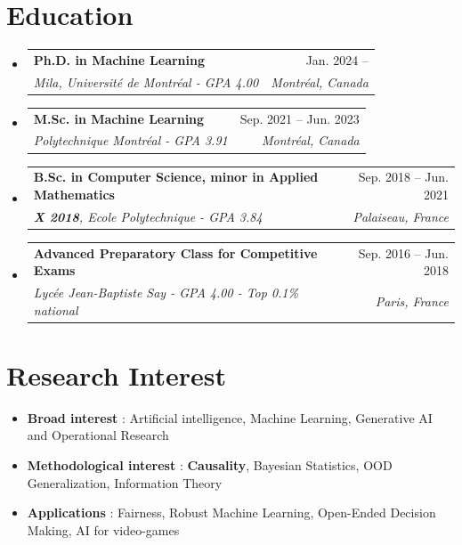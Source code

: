 \documentclass[letterpaper,11pt]{article}
\makeatletter
\newcommand{\resumeSubheading}[4]{
  \vspace{-2pt}\item
    \begin{tabular*}{0.97\textwidth}[t]{l@{\extracolsep{\fill}}r}
      \textbf{#1} & #2 \\
      \textit{\small#3} & \textit{\small #4} \\
    \end{tabular*}\vspace{-7pt}
}
\newcommand{\resumeSubHeadingListStart}{\begin{itemize}[leftmargin=0.15in, label={}]}
\newcommand{\resumeSubHeadingListEnd}{\end{itemize}}
\makeatother
\begin{document}
\section{Education}
  \resumeSubHeadingListStart
        \resumeSubheading
      {Ph.D. in Machine Learning}{Jan. 2024 -- }
      {Mila, Université de Montréal - GPA 4.00}{Montréal, Canada}
      \vspace{.2pt}
      \resumeSubheading
      {M.Sc. in Machine Learning}{Sep. 2021 -- Jun. 2023}
      {Polytechnique Montréal - GPA 3.91}{Montréal, Canada}
      \vspace{.2pt}
    \resumeSubheading
      {B.Sc. in Computer Science, minor in Applied Mathematics}{Sep. 2018 -- Jun. 2021}
      {\textbf{X 2018}, Ecole Polytechnique - GPA 3.84}{Palaiseau, France}
    \resumeSubheading
      {Advanced Preparatory Class for Competitive Exams}{Sep. 2016 -- Jun. 2018}
      {Lycée Jean-Baptiste Say - GPA 4.00 - Top 0.1\% national}{Paris, France}
      
  \resumeSubHeadingListEnd
\section{Research Interest}
        \begin{itemize}
            \item \textbf{Broad interest} : Artificial intelligence, Machine Learning, Generative AI and Operational Research
            \vspace{-5pt}
            \item \textbf{Methodological interest} : \textbf{Causality}, Bayesian Statistics, OOD Generalization, Information Theory
            \vspace{-5pt}
            \item \textbf{Applications} : Fairness, Robust Machine Learning, Open-Ended Decision Making, AI for video-games
        \end{itemize}
\end{document}
